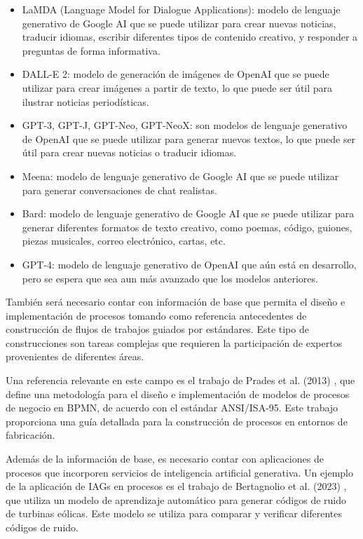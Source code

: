 \documentclass[12pt]{article}
\begin{document}
\begin{itemize}
    \item LaMDA (Language Model for Dialogue Applications): modelo de lenguaje generativo de Google AI que se puede utilizar para crear nuevas noticias, traducir idiomas, escribir diferentes tipos de contenido creativo, y responder a preguntas de forma informativa.
    \item DALL-E 2: modelo de generación de imágenes de OpenAI que se puede utilizar para crear imágenes a partir de texto, lo que puede ser útil para ilustrar noticias periodísticas.
    \item GPT-3, GPT-J, GPT-Neo, GPT-NeoX: son modelos de lenguaje generativo de OpenAI que se puede utilizar para generar nuevos textos, lo que puede ser útil para crear nuevas noticias o traducir idiomas.
    \item Meena: modelo de lenguaje generativo de Google AI que se puede utilizar para generar conversaciones de chat realistas.
    \item Bard: modelo de lenguaje generativo de Google AI que se puede utilizar para generar diferentes formatos de texto creativo, como poemas, código, guiones, piezas musicales, correo electrónico, cartas, etc.
    \item GPT-4: modelo de lenguaje generativo de OpenAI que aún está en desarrollo, pero se espera que sea aun más avanzado que los modelos anteriores. 
\end{itemize}

También será necesario contar con información de base que permita el diseño e implementación de procesos tomando como referencia antecedentes de construcción de flujos de trabajos guiados por estándares. Este tipo de construcciones son tareas complejas que requieren la participación de expertos provenientes de diferentes áreas. 

Una referencia relevante en este campo es el trabajo de Prades et al. (2013) \cite{PRADES2013115}, que define una metodología para el diseño e implementación de modelos de procesos de negocio en BPMN, de acuerdo con el estándar ANSI/ISA-95. Este trabajo proporciona una guía detallada para la construcción de procesos en entornos de fabricación.

Además de la información de base, es necesario contar con aplicaciones de procesos que incorporen servicios de inteligencia artificial generativa. Un ejemplo de la aplicación de IAGs en procesos es el trabajo de Bertagnolio et al. (2023) \cite{bertagnolio2023}, que utiliza un modelo de aprendizaje automático para generar códigos de ruido de turbinas eólicas. Este modelo se utiliza para comparar y verificar diferentes códigos de ruido.
\end{document}
